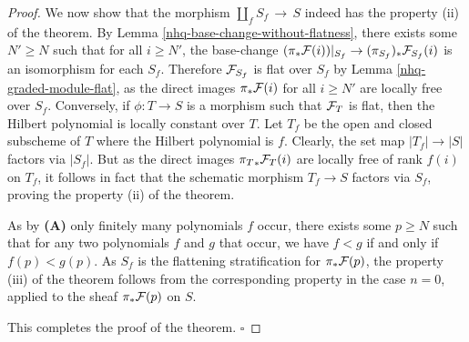 \begin{proof}
We now show that the morphism $\coprod_f S_f \,\to \,S$
indeed has the property (ii) of the theorem.
By Lemma \ref{nhq-base-change-without-flatness},
there exists some $N' \ge N$ such that for all $i\ge N'$,
the base-change
$(\pi_*\mathcal{F}(i))|_{S_f} \to (\pi_{S_f})_*\mathcal{F}_{S_f}(i)$ is an isomorphism for
each $S_f$. Therefore
$\mathcal{F}_{S_f}$ is flat over $S_f$ by Lemma \ref{nhq-graded-module-flat},
as the direct images $\pi_*\mathcal{F}(i)$ for all $i \ge N'$ are locally
free over $S_f$. Conversely, if $\phi : T\to S$ is a morphism such
that $\mathcal{F}_T$ is flat, then the Hilbert polynomial is locally
constant over $T$. Let $T_f$ be the open and closed subscheme of $T$
where the Hilbert polynomial is $f$. Clearly, the set
map $|T_f| \to |S|$ factors via $|S_f|$. But as the direct images
${\pi_T}_*\mathcal{F}_T(i)$ are locally free of rank $f(i)$ on $T_f$, it
follows in fact that the schematic morphism $T_f \to S$ factors
via $S_f$, proving the property (ii) of the theorem.

As by \textbf{(A)} only finitely many polynomials $f$ occur, there
exists some $p \ge N$ such that for any two polynomials $f$ and $g$
that occur, we have $f < g$ if and only if $f(p) < g(p)$.
As $S_f$ is the flattening stratification for $\pi_*\mathcal{F}(p)$,
the property (iii) of the theorem follows from the corresponding property in
the case $n=0$, applied to the sheaf $\pi_*\mathcal{F}(p)$ on $S$.

This completes the proof of the theorem.  \hfill$\square$\end{proof}


